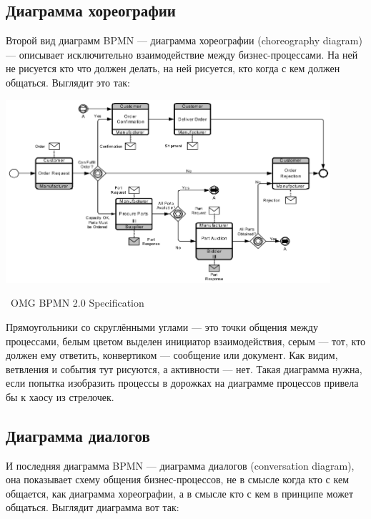 \documentclass[a5paper]{article}
\newcommand{\attribution}[1] {
    \vspace{-4mm}\begin{flushright}\begin{scriptsize}%
    {\textcopyright\, #1}\end{scriptsize}\end{flushright}
}
\begin{document}
\subsection{Диаграмма хореографии}

Второй вид диаграмм BPMN --- диаграмма хореографии (choreography diagram) --- описывает исключительно взаимодействие между бизнес-процессами. На ней не рисуется кто что должен делать, на ней рисуется, кто когда с кем должен общаться. Выглядит это так:

\begin{center}
    \includegraphics[width=0.9\textwidth]{bpmnChoreography.png}
    \attribution{OMG BPMN 2.0 Specification}
\end{center}

Прямоугольники со скруглёнными углами --- это точки общения между процессами, белым цветом выделен инициатор взаимодействия, серым --- тот, кто должен ему ответить, конвертиком --- сообщение или документ. Как видим, ветвления и события тут рисуются, а активности --- нет. Такая диаграмма нужна, если попытка изобразить процессы в дорожках на диаграмме процессов привела бы к хаосу из стрелочек.

\subsection{Диаграмма диалогов}

И последняя диаграмма BPMN --- диаграмма диалогов (conversation diagram), она показывает схему общения бизнес-процессов, не в смысле когда кто с кем общается, как диаграмма хореографии, а в смысле кто с кем в принципе может общаться. Выглядит диаграмма вот так:
\end{document}
